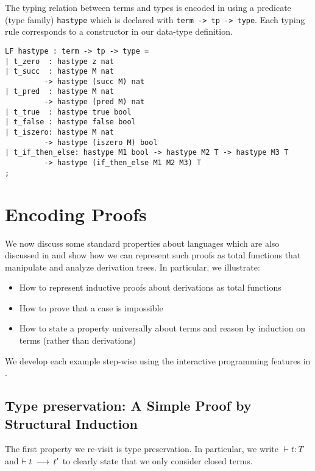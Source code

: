 The typing relation between terms and types is encoded in \beluga using a
predicate (type family) \lstinline!hastype! which is declared with
\lstinline!term -> tp -> type!. Each typing rule corresponds to a constructor in
our data-type definition. 

\begin{lstlisting}
LF hastype : term -> tp -> type =
| t_zero  : hastype z nat
| t_succ  : hastype M nat
         -> hastype (succ M) nat
| t_pred  : hastype M nat
         -> hastype (pred M) nat
| t_true  : hastype true bool
| t_false : hastype false bool
| t_iszero: hastype M nat
         -> hastype (iszero M) bool
| t_if_then_else: hastype M1 bool -> hastype M2 T -> hastype M3 T
         -> hastype (if_then_else M1 M2 M3) T
;
\end{lstlisting} 

\section{Encoding Proofs}

We now discuss some standard properties about languages which are also discussed
in \cite{TAPL} and show how we can represent such proofs as total functions that
manipulate and analyze derivation trees. In particular, we illustrate:

\begin{itemize}
\item How to represent inductive proofs about derivations as total functions 
\item How to prove that a case is impossible
\item How to state a property universally about terms and reason by induction on
  terms (rather than derivations)
\end{itemize}

We develop each example step-wise using the interactive programming features in \beluga.

\subsection{Type preservation: A Simple Proof by Structural Induction} The first property we re-visit is type
preservation. In particular, we write $\vdash t : T$ and $\vdash t
\mathrel{\,\longrightarrow\,} t'$ to clearly state that we only consider closed terms.

